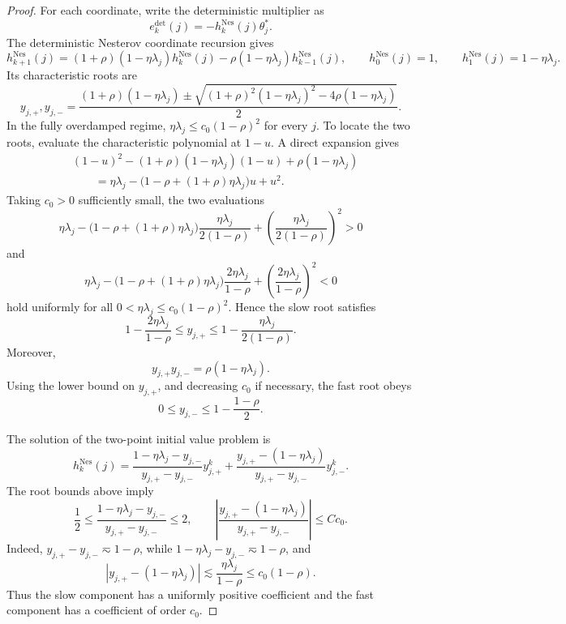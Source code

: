 \begin{proof}
For each coordinate, write the deterministic multiplier as
\[
    e_k^{\mathrm{det}}(j)=-h_k^{\mathrm{Nes}}(j)\theta_j^*.
\]
The deterministic Nesterov coordinate recursion gives
\[
    h_{k+1}^{\mathrm{Nes}}(j)
    =
    (1+\rho)(1-\eta\lambda_j)h_k^{\mathrm{Nes}}(j)
    -\rho(1-\eta\lambda_j)h_{k-1}^{\mathrm{Nes}}(j),
    \qquad
    h_0^{\mathrm{Nes}}(j)=1,
    \qquad
    h_1^{\mathrm{Nes}}(j)=1-\eta\lambda_j.
\]
Its characteristic roots are
\[
    y_{j,+},y_{j,-}
    =
    \frac{(1+\rho)(1-\eta\lambda_j)
    \pm
    \sqrt{(1+\rho)^2(1-\eta\lambda_j)^2-4\rho(1-\eta\lambda_j)}}{2}.
\]
In the fully overdamped regime, \(\eta\lambda_j\le c_0(1-\rho)^2\) for every \(j\).  To locate the two roots, evaluate the characteristic polynomial at \(1-u\).  A direct expansion gives
\[
\begin{aligned}
    &(1-u)^2
    -(1+\rho)(1-\eta\lambda_j)(1-u)
    +\rho(1-\eta\lambda_j) \\
    &\qquad=
    \eta\lambda_j
    -\bigl(1-\rho+(1+\rho)\eta\lambda_j\bigr)u
    +u^2.
\end{aligned}
\]
Taking \(c_0>0\) sufficiently small, the two evaluations
\[
    \eta\lambda_j
    -\bigl(1-\rho+(1+\rho)\eta\lambda_j\bigr)
    \frac{\eta\lambda_j}{2(1-\rho)}
    +
    \left(\frac{\eta\lambda_j}{2(1-\rho)}\right)^2
    >0
\]
and
\[
    \eta\lambda_j
    -\bigl(1-\rho+(1+\rho)\eta\lambda_j\bigr)
    \frac{2\eta\lambda_j}{1-\rho}
    +
    \left(\frac{2\eta\lambda_j}{1-\rho}\right)^2
    <0
\]
hold uniformly for all \(0<\eta\lambda_j\le c_0(1-\rho)^2\).  Hence the slow root satisfies
\[
    1-\frac{2\eta\lambda_j}{1-\rho}
    \le
    y_{j,+}
    \le
    1-\frac{\eta\lambda_j}{2(1-\rho)}.
\]
Moreover,
\[
    y_{j,+}y_{j,-}=\rho(1-\eta\lambda_j).
\]
Using the lower bound on \(y_{j,+}\), and decreasing \(c_0\) if necessary, the fast root obeys
\[
    0\le y_{j,-}
    \le
    1-\frac{1-\rho}{2}.
\]

The solution of the two-point initial value problem is
\[
    h_k^{\mathrm{Nes}}(j)
    =
    \frac{1-\eta\lambda_j-y_{j,-}}{y_{j,+}-y_{j,-}}y_{j,+}^{k}
    +
    \frac{y_{j,+}-(1-\eta\lambda_j)}{y_{j,+}-y_{j,-}}y_{j,-}^{k}.
\]
The root bounds above imply
\[
    \frac12
    \le
    \frac{1-\eta\lambda_j-y_{j,-}}{y_{j,+}-y_{j,-}}
    \le
    2,
    \qquad
    \left|
    \frac{y_{j,+}-(1-\eta\lambda_j)}{y_{j,+}-y_{j,-}}
    \right|
    \le
    Cc_0.
\]
Indeed, \(y_{j,+}-y_{j,-}\eqsim1-\rho\), while \(1-\eta\lambda_j-y_{j,-}\eqsim1-\rho\), and
\[
    \left|y_{j,+}-(1-\eta\lambda_j)\right|
    \lesssim
    \frac{\eta\lambda_j}{1-\rho}
    \le
    c_0(1-\rho).
\]
Thus the slow component has a uniformly positive coefficient and the fast component has a coefficient of order \(c_0\).


\end{proof}
